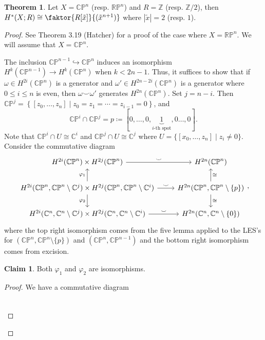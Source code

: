 \documentclass[10pt,letterpaper,cm]{nupset}
\theoremstyle{definition}
\theoremstyle{theorem}
\newtheorem{theorem}[definition]{Theorem}
\newtheorem*{claim}{Claim}
\theoremstyle{remark}
\newcommand{\C}{\mathbb C}
\newcommand{\CP}{\mathbb{CP}}
\newcommand{\RP}{\mathbb{RP}}
\newcommand{\Z}{\mathbb Z}
\newcommand{\1}{\mathbb{1}}
\newcommand{\0}{\vec 0}
\begin{document}
\begin{theorem}
Let $X = \CP^n$ (resp. $\RP^n$) and $R = \Z$ (resp. $\Z/2$), then $H^{\ast}(X; R) \cong \faktor{R[\tilde{x}]}{(\tilde{x}^{n+1})}$ where $\left\lvert{\tilde{x}}\right\rvert =2$ (resp. $1$).
\end{theorem}
\begin{proof}
See Theorem 3.19 (Hatcher) for a proof of the case where $X= \RP^n$. We will assume that $X = \CP^n$.

\medskip

 The inclusion $\CP^{n-1} \hookrightarrow \CP^n$ induces an isomorphism $H^k(\CP^{n-1}) \to H^k(\CP^n)$ when $k < 2n-1$. Thus, it suffices to show that if $\omega \in H^{2i}(\CP^n)$ is a generator and $\omega ' \in H^{2n -2i}(\CP^n)$ is a generator where $0\leq i \leq n$ is even, then $\omega \smile \omega '$ generates $H^{2n}(\CP^n)$. Set $j = n-i$. Then $\CP^j = \left\{[z_0, \ldots, z_n] \mid z_0 = z_1 = \cdots = z_{i-1}= 0\right\}$, and $$\CP^i \cap \CP^j = p\coloneqq  \left[0, \ldots, 0, \underbrace{1}_{i\text{-th spot}}, 0 \ldots, 0\right].$$ Note that $\CP^i \cap U \cong \C^i$ and $\CP^j \cap U \cong \C^j$ where $U = \{[x_0, \ldots, z_n] \mid z_i \ne 0\}$. Consider the commutative diagram
\[
\begin{tikzcd}
H^{2i}(\CP^n)\times H^{2j}(\CP^n) \arrow[r, "\smile"]                                                                                              & H^{2n}(\CP^n)                                                                 \\
{H^{2i}(\CP^n, \CP^n \setminus \C^j)\times H^{2j}(\CP^n, \CP^n \setminus \C^i)} \arrow[r, "\smile"] \arrow[u, "\varphi_1"] \arrow[d, "\varphi_2"'] & {H^{2n}(\CP^n, \CP^n \setminus \{p\})} \arrow[u, "\cong"'] \arrow[d, "\cong"] \\
{H^{2i}(\C^n, \C^n \setminus \C^j)\times H^{2j}(\C^n, \C^n \setminus \C^i)} \arrow[r, "\smile"]                                                    & {H^{2n}(\C^n, \C^n \setminus \{0\})}                                         
\end{tikzcd}
,\] where the top right isomorphism comes from the five lemma applied to the LES's for $(\CP^n, \CP^n \setminus \{p\})$ and $(\CP^n, \CP^{n-1})$ and the bottom right isomorphism comes from excision. 
\begin{claim}
Both $\varphi_1$ and $\varphi_2$ are isomorphisms. 
\end{claim}
\begin{proof}
We have a commutative diagram 
\[
\begin{tikzcd}

\end{tikzcd}\]
\end{proof}
\end{proof}
\end{document}
